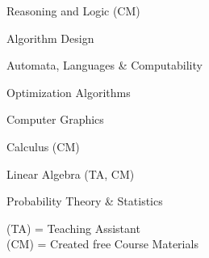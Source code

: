 \documentclass[]{deedy-resume-openfont}
\begin{document}
\begin{minipage}[t]{0.33\textwidth}
\begin{small}
\vspace{0.6\topsep}
\begin{tightemize}
    \item Reasoning and Logic (CM)
    \item Algorithm Design
    \item Automata, Languages \& Computability
    \item Optimization Algorithms
\end{tightemize}
\vspace{0.8\topsep}
\end{small}

\begin{small}
\vspace{0.6\topsep}
\begin{tightemize}
    \item Computer Graphics
    \item Calculus (CM)
    \item Linear Algebra (TA, CM)
    \item Probability Theory \& Statistics
\end{tightemize}
\vspace{0.8\topsep}
\end{small}

(TA) = Teaching Assistant \\
(CM) = Created free Course Materials

%
%

\end{minipage} 
\hfill
\end{document}
